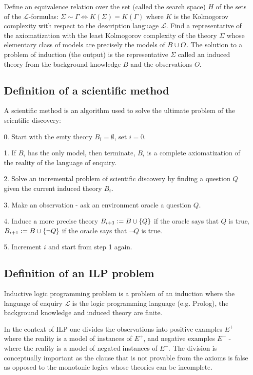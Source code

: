 Define an equivalence relation over the set (called the search space) $H$ of the sets of the $\mathcal{L}$-formulas: $\Sigma \sim \Gamma \iff K(\Sigma)=K(\Gamma)$ where $K$ is the Kolmogorov complexity with respect to the description language $\mathcal{L}$. Find a representative of the axiomatization with the least Kolmogorov complexity of the theory $\Sigma$ whose elementary class of models are precisely the models of $B \cup O$. The solution  to a problem of induction (the output) is the representative $\Sigma$ called an induced theory from the background knowledge $B$ and the observations $O$.

\subsection{Definition of a scientific method}
A scientific method is an algorithm used to solve the ultimate problem of the scientific discovery:

0. Start with the emty theory $B_i=\emptyset$, set $i=0$.

1. If $B_i$ has the only model, then terminate, $B_i$ is a complete axiomatization of the reality of the language of enquiry.

2. Solve an incremental problem of scientific discovery by finding a question $Q$ given the current induced theory $B_i$.

3. Make an observation - ask an environment oracle a question $Q$.

4. Induce a more precise theory $B_{i+1}:=B \cup \{Q\}$ if the oracle says that $Q$ is true, $B_{i+1}:=B \cup \{\neg Q\}$ if the oracle says that $\neg Q$ is true.

5. Increment $i$ and start from step 1 again.

\subsection{Definition of an ILP problem}
Inductive logic programming problem is a problem of an induction where the language of enquiry $\mathcal{L}$ is the logic programming language (e.g. Prolog), the background knowledge and induced theory are finite.

In the context of ILP one divides the observations into positive examples $E^+$ where the reality is a model of instances of $E^+$, and negative examples $E^-$ - where the reality is a model of negated instances of $E^-$. The division is conceptually important as the clause that is not provable from the axioms is false as opposed to the monotonic logics whose theories can be incomplete.

